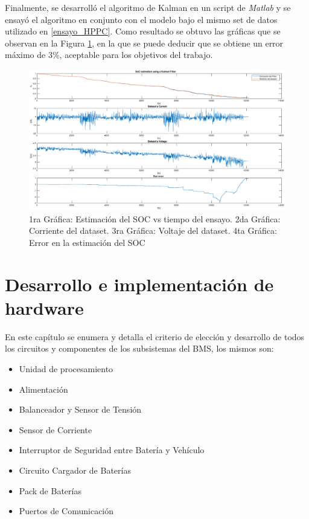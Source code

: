 \documentclass[10pt, a4paper]{report}
\begin{document}
Finalmente, se desarroll\'o el algoritmo de Kalman en un script de \emph{Matlab}
y se ensay\'o el algoritmo en conjunto con el modelo bajo el mismo set de datos
utilizado en \ref{ensayo_HPPC}. Como resultado se obtuvo las gr\'aficas que se
observan en la Figura \ref{kalman_result_matlab}, en la que se puede deducir que
se obtiene un error m\'aximo de 3\%, aceptable para los objetivos del trabajo.

\begin{figure}[h!]
    \begin{center}
        \includegraphics[width=1\textwidth]{kalman_result_matlab.eps}
        \caption{1ra Gr\'afica: Estimaci\'on del \acrshort{SOC} vs
        tiempo del ensayo. 2da Gr\'afica: Corriente del dataset. 3ra
        Gr\'afica: Voltaje del dataset. 4ta Gr\'afica: Error en la estimaci\'on
        del \acrshort{SOC}} 
        \label{kalman_result_matlab}
    \end{center}
\end{figure}

\newpage

\chapter{Desarrollo e implementación de hardware}\label{desarrollo_hw}
\thispagestyle{fancy}

En este capítulo se enumera y detalla el criterio de elección y desarrollo de 
todos los circuitos y componentes de los subsistemas del BMS, los mismos son:

\begin{itemize}
	\item Unidad de procesamiento
	\item Alimentación
	\item Balanceador y Sensor de Tensión
	\item Sensor de Corriente
	\item Interruptor de Seguridad entre Batería y Vehículo
	\item Circuito Cargador de Baterías
    \item Pack de Baterías
	\item Puertos de Comunicación
\end{itemize}
\end{document}
